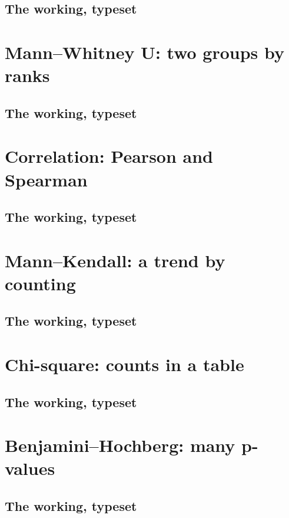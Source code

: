 \subsection*{The working, typeset}


\section{Mann--Whitney U: two groups by ranks}

\subsection*{The working, typeset}


\section{Correlation: Pearson and Spearman}

\subsection*{The working, typeset}


\section{Mann--Kendall: a trend by counting}

\subsection*{The working, typeset}


\section{Chi-square: counts in a table}

\subsection*{The working, typeset}


\section{Benjamini--Hochberg: many p-values}

\subsection*{The working, typeset}


